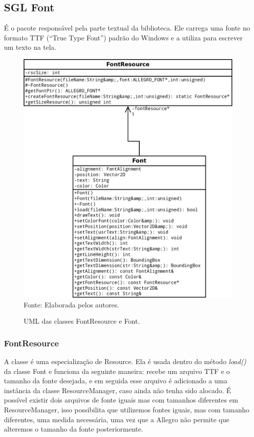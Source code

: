 \subsection{SGL Font}
%
%
É o pacote responsável pela parte textual da biblioteca. Ele carrega uma fonte no formato TTF (``True Type Font'') padrão do Windows e a utiliza para escrever um texto na tela.
%
%
%
\begin{figure}[H]
    \centering
    \caption{UML das classes FontResource e Font.}
    \label{Font}
    \includegraphics[scale = 0.20]{uml/Font.png}
    \\Fonte: Elaborada pelos autores.
\end{figure}
%
%
\subsubsection{FontResource}
%
%
A classe é uma especialização de Resource. Ela é usada dentro do método \textit{load()} da classe Font e funciona da seguinte maneira: recebe um arquivo TTF e o tamanho da fonte desejada, e em seguida esse arquivo é adicionado a uma instância da classe ResourceManager, caso ainda não tenha sido alocado. É possível existir dois arquivos de fonte iguais mas com tamanhos diferentes em ResourceManager, isso possibilita que utilizemos fontes iguais, mas com tamanho diferentes, uma medida necessária, uma vez que a Allegro não permite que alteremos o tamanho da fonte posteriormente.
%
%
